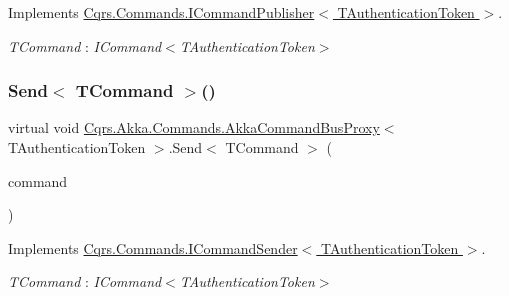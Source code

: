 Implements \hyperlink{interfaceCqrs_1_1Commands_1_1ICommandPublisher_af0f033c0b949e5650032e4f00b11b595}{Cqrs.\+Commands.\+I\+Command\+Publisher$<$ T\+Authentication\+Token $>$}.

\begin{Desc}
\item[Type Constraints]\begin{description}
\item[{\em T\+Command} : {\em I\+Command$<$T\+Authentication\+Token$>$}]\end{description}
\end{Desc}
\mbox{\label{classCqrs_1_1Akka_1_1Commands_1_1AkkaCommandBusProxy_a15945f41b7439e722f5608f48b63c6d9}} 
\subsubsection{\texorpdfstring{Send$<$ T\+Command $>$()}{Send< TCommand >()}\hspace{0.1cm}{\footnotesize\ttfamily [1/2]}}
{\footnotesize\ttfamily virtual void \hyperlink{classCqrs_1_1Akka_1_1Commands_1_1AkkaCommandBusProxy}{Cqrs.\+Akka.\+Commands.\+Akka\+Command\+Bus\+Proxy}$<$ T\+Authentication\+Token $>$.Send$<$ T\+Command $>$ (\begin{DoxyParamCaption}\item[{T\+Command}]{command }\end{DoxyParamCaption})\hspace{0.3cm}{\ttfamily [virtual]}}



Implements \hyperlink{interfaceCqrs_1_1Commands_1_1ICommandSender_a551d69f8679399fc0ce0fd99dead507a}{Cqrs.\+Commands.\+I\+Command\+Sender$<$ T\+Authentication\+Token $>$}.

\begin{Desc}
\item[Type Constraints]\begin{description}
\item[{\em T\+Command} : {\em I\+Command$<$T\+Authentication\+Token$>$}]\end{description}
\end{Desc}
\mbox{\label{classCqrs_1_1Akka_1_1Commands_1_1AkkaCommandBusProxy_a30115e2f8c964967aa8fe94712ece7c2}} 
